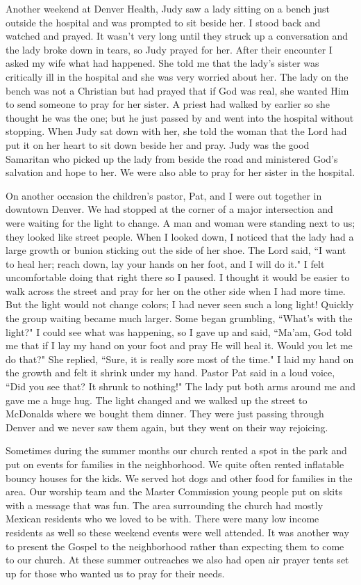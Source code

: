 \documentclass[oneside,12pt]{book}
\begin{document}
Another weekend at Denver Health, Judy saw a lady sitting on a bench just outside the hospital and was prompted to sit beside her. I stood back and watched and prayed. It wasn't very long until they struck up a conversation and the lady broke down in tears, so Judy prayed for her. After their encounter I asked my wife what had happened. She told me that the lady's sister was critically ill in the hospital and she was very worried about her. The lady on the bench was not a Christian but had prayed that if God was real, she wanted Him to send someone to pray for her sister. A priest had walked by earlier so she thought he was the one; but he just passed by and went into the hospital without stopping. When Judy sat down with her, she told the woman that the Lord had put it on her heart to sit down beside her and pray. Judy was the good Samaritan who picked up the lady from beside the road and ministered God's salvation and hope to her. We were also able to pray for her sister in the hospital. 


On another occasion the children's pastor, Pat, and I were out together in downtown Denver. We had stopped at the corner of a major intersection and were waiting for the light to change. A man and woman were standing next to us; they looked like street people. When I looked down, I noticed that the lady had a large growth or bunion sticking out the side of her shoe. The Lord said, ``I want to heal her; reach down, lay your hands on her foot, and I will do it." I felt uncomfortable doing that right there so I paused. I thought it would be easier to walk across the street and pray for her on the other side when I had more time. But the light would not change colors; I had never seen such a long light! Quickly the group waiting became much larger. Some began grumbling, ``What's with the light?" I could see what was happening, so I gave up and said, ``Ma'am, God told me that if I lay my hand on your foot and pray He will heal it. Would you let me do that?" She replied, ``Sure, it is really sore most of the time." I laid my hand on the growth and felt it shrink under my hand. Pastor Pat said in a loud voice, ``Did you see that? It shrunk to nothing!" The lady put both arms around me and gave me a huge hug. The light changed and we walked up the street to McDonalds where we bought them dinner. They were just passing through Denver and we never saw them again, but they went on their way rejoicing.

Sometimes during the summer months our church rented a spot in the park and put on events for families in the neighborhood. We quite often rented inflatable bouncy houses for the kids. We served hot dogs and other food for families in the area. Our worship team and the Master Commission young people put on skits with a message that was fun. The area surrounding the church had mostly Mexican residents who we loved to be with. There were many low income residents as well so these weekend events were well attended. It was another way to present the Gospel to the neighborhood rather than expecting them to come to our church. At these summer outreaches we also had open air prayer tents set up for those who wanted us to pray for their needs. 
\end{document}
